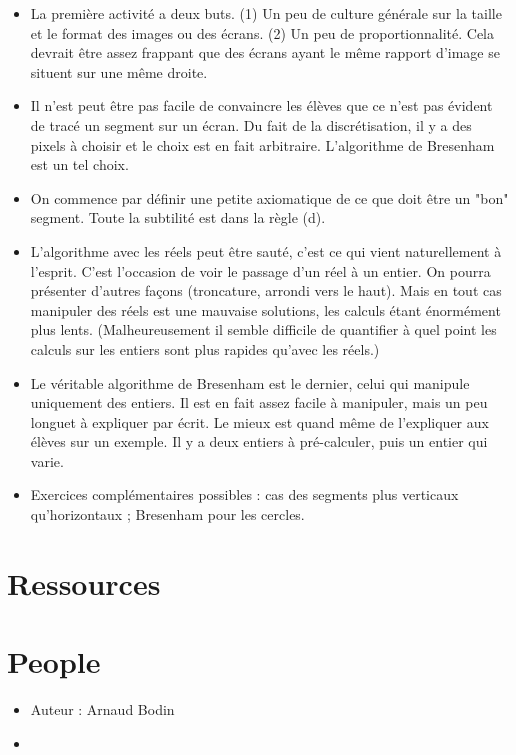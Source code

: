 \documentclass[class=report,crop=false, 12pt]{standalone}
\begin{document}
\begin{itemize}
  \item La première activité a deux buts. (1) Un peu de culture générale sur la taille et le format des images ou des écrans. (2) Un peu de proportionnalité.
Cela devrait être assez frappant que des écrans ayant le même rapport d'image
se situent sur une même droite.

  \item Il n'est peut être pas facile de convaincre les élèves que ce n'est pas évident de tracé un segment sur un écran. Du fait de la discrétisation, il y a des pixels à choisir et le choix est en fait arbitraire. L'algorithme de Bresenham est un tel choix.
  
  \item On commence par définir une petite axiomatique de ce que doit être un "bon" segment. Toute la subtilité est dans la règle (d).
  
  \item L'algorithme avec les réels peut être sauté, c'est ce qui vient naturellement à l'esprit. C'est l'occasion de voir le passage d'un réel à un entier. On pourra présenter d'autres façons (troncature, arrondi vers le haut). 
Mais en tout cas manipuler des réels est une mauvaise solutions, les calculs étant énormément plus lents. (Malheureusement il semble difficile de quantifier à quel point les calculs sur les entiers sont plus rapides qu'avec les réels.) 
  
  \item Le véritable algorithme de Bresenham est le dernier, celui qui manipule uniquement des entiers.     
Il est en fait assez facile à manipuler, mais un peu longuet à expliquer par écrit. Le mieux est quand  même de l'expliquer aux élèves sur un exemple. 
Il y a deux entiers à pré-calculer, puis un entier qui varie.

 \item Exercices complémentaires possibles : cas des segments plus verticaux qu'horizontaux ; Bresenham pour les cercles.
 
 
 \end{itemize}



\section*{Ressources}


\section*{People}

\begin{itemize}
  \item Auteur : Arnaud Bodin
  \item 
\end{itemize}
\end{document}
